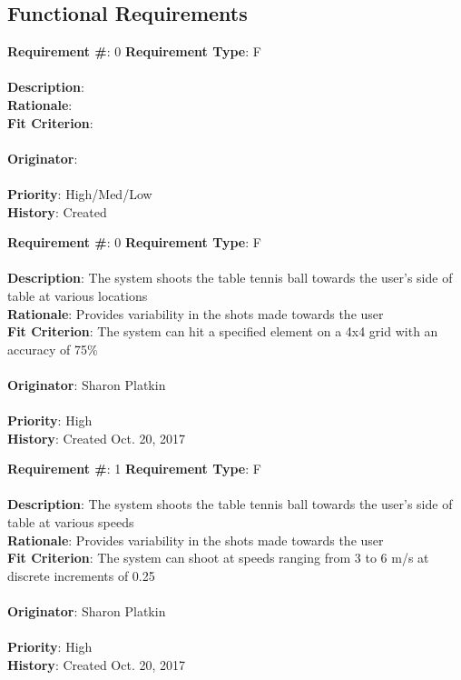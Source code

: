 \documentclass[11pt]{article}
\begin{document}
\subsection{Functional Requirements}
\begin{framed}
	\noindent\textbf{Requirement \#}: 0 \hfill \textbf{Requirement Type}: F \hfill\\\\
	\noindent\textbf{Description}:  \\
	\textbf{Rationale}: \\
	\textbf{Fit Criterion}: \\\\
	\textbf{Originator}: \\\\
	\textbf{Priority}: High/Med/Low \hfill \\
	\noindent\textbf{History}: Created 
\end{framed}

\begin{framed}
	\noindent\textbf{Requirement \#}: 0 \hfill \textbf{Requirement Type}: F \hfill\\\\
	\noindent\textbf{Description}: The system shoots the table tennis ball towards the user's side of table at various locations \\
	\textbf{Rationale}: Provides variability in the shots made towards the user \\
	\textbf{Fit Criterion}: The system can hit a specified element on a 4x4 grid with an accuracy of 75\%\\\\
	\textbf{Originator}: Sharon Platkin \\\\
	\textbf{Priority}: High \hfill \\
	\noindent\textbf{History}: Created Oct. 20, 2017
\end{framed}

\begin{framed}
	\noindent\textbf{Requirement \#}: 1 \hfill \textbf{Requirement Type}: F \hfill\\\\
	\noindent\textbf{Description}: The system shoots the table tennis ball towards the user's side of table at various speeds \\
	\textbf{Rationale}: Provides variability in the shots made towards the user \\
	\textbf{Fit Criterion}: The system can shoot at speeds ranging from 3 to 6 m/s at discrete increments of 0.25 \\\\
	\textbf{Originator}: Sharon Platkin \\\\
	\textbf{Priority}: High \hfill \\
	\noindent\textbf{History}: Created Oct. 20, 2017
\end{framed}
\end{document}
